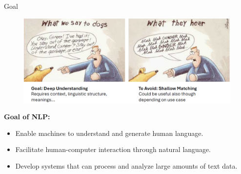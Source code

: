 \begin{frame}[allowframebreaks]{Goal}
    \begin{figure}
        \centering
        \includegraphics[width=\textwidth,height=0.9\textheight,keepaspectratio]{images/nlp-intro/goal.png}
    \end{figure}
\framebreak
    \large \textbf{Goal of NLP:}
    \begin{itemize}
        \setlength{\itemsep}{1em}
        \item Enable machines to understand and generate human language.
        \item Facilitate human-computer interaction through natural language.
        \item Develop systems that can process and analyze large amounts of text data.
    \end{itemize}
\end{frame}


